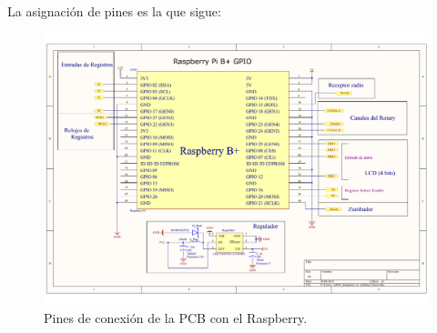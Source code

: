La asignación de pines es la que sigue:

\smallskip

\begin{figure}[H]
	\noindent \begin{centering}
		\includegraphics[width=\linewidth*2/3]{capitulo3/pcb_gpio}
		\par\end{centering}
	\smallskip
	\caption{\label{fig:pcb_gpio} Pines de conexión de la PCB con el Raspberry.}
\end{figure} 

\smallskip

